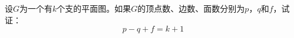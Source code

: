 \begin{Exercise}
    设$G$为一个有$k$个支的平面图。如果$G$的顶点数、边数、面数分别为$p$，$q$和$f$，试证：
  \[p-q+f=k+1\]
\end{Exercise}
